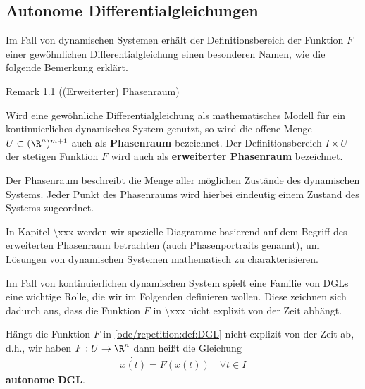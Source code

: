 \documentclass[letterpaper,10pt,english]{jupyterBook}
\begin{document}
\subsection{Autonome Differentialgleichungen}
\label{\detokenize{ode/repetition:autonome-differentialgleichungen}}
Im Fall von dynamischen Systemen erhält der Definitionsbereich der Funktion \(F\) einer gewöhnlichen Differentialgleichung einen besonderen Namen, wie die folgende Bemerkung erklärt.
\label{ode/repetition:remark-1}
\begin{emphBox}{}{}{Remark 1.1 ((Erweiterter) Phasenraum)}



Wird eine gewöhnliche Differentialgleichung als mathematisches Modell für ein kontinuierliches dynamisches System genutzt, so wird die offene Menge \(U\subset (\R^n)^{m+1}\) auch als \textbf{Phasenraum} bezeichnet.
Der Definitionsbereich \(I\times U\) der stetigen Funktion \(F\) wird auch als \textbf{erweiterter Phasenraum} bezeichnet.

Der Phasenraum beschreibt die Menge aller möglichen Zustände des dynamischen Systems.
Jeder Punkt des Phasenraums wird hierbei eindeutig einem Zustand des Systems zugeordnet.

In Kapitel \textbackslash{}xxx werden wir spezielle Diagramme basierend auf dem Begriff des erweiterten Phasenraum betrachten (auch Phasenportraits genannt), um Lösungen von dynamischen Systemen mathematisch zu charakterisieren.
\end{emphBox}

Im Fall von kontinuierlichen dynamischen System spielt eine Familie von DGLs eine wichtige Rolle, die wir im Folgenden definieren wollen.
Diese zeichnen sich dadurch aus, dass die Funktion \(F\) in \textbackslash{}xxx nicht explizit von der Zeit abhängt.
\label{ode/repetition:definition-2}
\begin{definition}{}{}



Hängt die Funktion \(F\) in \cref{ode/repetition:def:DGL} nicht explizit von der Zeit ab, d.h., wir haben \(F:U\rightarrow\R^n\) dann heißt die Gleichung
\begin{align}\label{equation:ode/repetition:eq:autonome_DGL}
\dot{x(t)} = F(x(t))\quad\forall t\in I
\end{align}
\textbf{autonome DGL}.
\end{definition}
\end{document}
